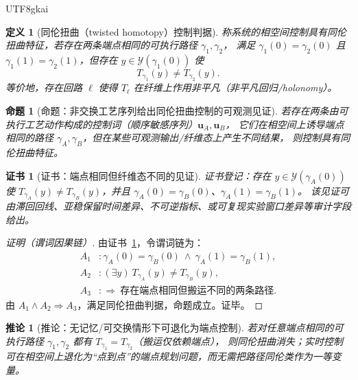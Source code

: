 \documentclass[12pt]{article}
\newtheorem{definition}{定义}[section]
\newtheorem{proposition}{命题}[section]
\newtheorem{corollary}{推论}[section]
\newtheorem{Certificate}{证书}[section]
\begin{document}
\begin{CJK*}{UTF8}{gkai}
\begin{definition}[同伦扭曲（twisted homotopy）控制判据]
称系统的相空间控制具有同伦扭曲特征，若存在两条端点相同的可执行路径 $\gamma_1,\gamma_2$，
满足 $\gamma_1(0)=\gamma_2(0)$ 且 $\gamma_1(1)=\gamma_2(1)$，但存在 $y\in\mathcal{Y}(\gamma_1(0))$ 使
\[
  T_{\gamma_1}(y)\neq T_{\gamma_2}(y).
\]
等价地，存在回路 $\ell$ 使得 $T_{\ell}$ 在纤维上作用非平凡（非平凡回归/holonomy）。
\end{definition}

\begin{proposition}[命题：非交换工艺序列给出同伦扭曲控制的可观测见证]
\label{prop:noncommutative-process-implies-twist}
若存在两条由可执行工艺动作构成的控制词（顺序敏感序列）$\mathbf{u}_A,\mathbf{u}_B$，
它们在相空间上诱导端点相同的路径 $\gamma_A,\gamma_B$，但在某些可观测输出/纤维态上产生不同结果，
则控制具有同伦扭曲特征。
\end{proposition}

\begin{Certificate}[证书：端点相同但纤维态不同的见证]
\label{cert:noncommutative-process-implies-twist}
证书登记：存在 $y\in\mathcal{Y}(\gamma_A(0))$ 使
$T_{\gamma_A}(y)\neq T_{\gamma_B}(y)$，并且 $\gamma_A(0)=\gamma_B(0)$、$\gamma_A(1)=\gamma_B(1)$。
该见证可由滞回回线、亚稳保留时间差异、不可逆指标、或可复现实验窗口差异等审计字段给出。
\end{Certificate}

\begin{proof}[证明（谓词因果链）]
由证书~\ref{cert:noncommutative-process-implies-twist}，令谓词链为：
\[
\begin{aligned}
  A_1 &: \gamma_A(0)=\gamma_B(0)\ \wedge\ \gamma_A(1)=\gamma_B(1),\\
  A_2 &: (\exists y)\ T_{\gamma_A}(y)\neq T_{\gamma_B}(y),\\
  A_3 &: \Rightarrow\ \text{存在端点相同但搬运不同的两条路径}.
\end{aligned}
\]
由 $A_1\wedge A_2\Rightarrow A_3$，满足同伦扭曲判据，命题成立。证毕。
\end{proof}

\begin{corollary}[推论：无记忆/可交换情形下可退化为端点控制]
\label{cor:untwisted-reduces-to-endpoint-control}
若对任意端点相同的可执行路径 $\gamma_1,\gamma_2$ 都有 $T_{\gamma_1}=T_{\gamma_2}$（搬运仅依赖端点），
则同伦扭曲消失；实时控制可在相空间上退化为“点到点”的端点规划问题，而无需把路径同伦类作为一等变量。
\end{corollary}


\end{CJK*}
\end{document}
